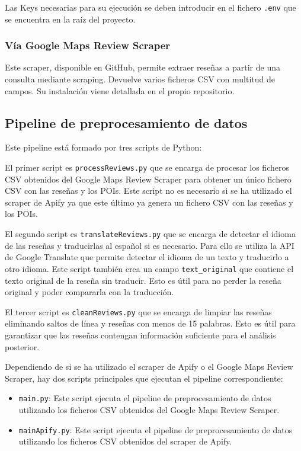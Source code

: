 Las Keys necesarias para su ejecución se deben introducir en el fichero \texttt{.env} que se encuentra en la raíz del proyecto.

\subsubsection{Vía Google Maps Review Scraper}

Este scraper, disponible en GitHub, permite extraer reseñas a partir de una consulta mediante scraping.
Devuelve varios ficheros CSV con multitud de campos. Su instalación viene detallada en el propio repositorio.\cite{scraper}

\subsection{Pipeline de preprocesamiento de datos}

Este pipeline está formado por tres scripts de Python:

El primer script es \texttt{processReviews.py} que se encarga de procesar los ficheros CSV obtenidos del Google Maps Review Scraper para obtener un único fichero CSV con las reseñas y los POIs.
Este script no es necesario si se ha utilizado el scraper de Apify ya que este último ya genera un fichero CSV con las reseñas y los POIs.

El segundo script es \texttt{translateReviews.py} que se encarga de detectar el idioma de las reseñas y traducirlas al español si es necesario.
Para ello se utiliza la API de Google Translate que permite detectar el idioma de un texto y traducirlo a otro idioma.
Este script también crea un campo \texttt{text\_original} que contiene el texto original de la reseña sin traducir.
Esto es útil para no perder la reseña original y poder compararla con la traducción.

El tercer script es \texttt{cleanReviews.py} que se encarga de limpiar las reseñas eliminando saltos de línea y reseñas con menos de 15 palabras.
Esto es útil para garantizar que las reseñas contengan información suficiente para el análisis posterior.

Dependiendo de si se ha utilizado el scraper de Apify o el Google Maps Review Scraper, hay dos scripts principales que ejecutan el pipeline correspondiente:

\begin{itemize}
    \item \texttt{main.py}: Este script ejecuta el pipeline de preprocesamiento de datos utilizando los ficheros CSV obtenidos del Google Maps Review Scraper.
    \item \texttt{mainApify.py}: Este script ejecuta el pipeline de preprocesamiento de datos utilizando los ficheros CSV obtenidos del scraper de Apify.
\end{itemize}

